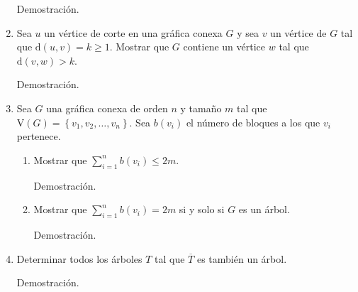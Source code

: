 \documentclass[12pt, fleqn]{article}
\newcommand{\V}[1]{\mathrm{V} \! \left( #1 \right)}
\newcommand{\dist}[2]{\mathrm{d}(#1,#2)}
\begin{document}
\begin{enumerate}
		Demostración.



		\item Sea $ u $ un vértice de corte en una gráfica conexa $ G $ y sea $ v $ un vértice de $ G $ tal que $ \dist{u}{v} = k \geq 1 $. Mostrar que $ G $ contiene un vértice $ w $ tal que $ \dist{v}{w} > k $.
		
		Demostración.



		\item Sea $ G $ una gráfica conexa de orden $ n $ y tamaño $ m $ tal que $ \V{G} = \left\{ v_1, v_2, \ldots, v_n \right\} $. Sea $ b(v_i) $ el número de bloques a los que $ v_i $ pertenece.
		
		\begin{enumerate}
			\item Mostrar que $ \displaystyle \sum_{i=1}^{n} b(v_i) \leq 2m $.
			
			Demostración.



			\item Mostrar que $ \displaystyle \sum_{i=1}^{n} b(v_i) = 2m $ si y solo si $ G $ es un árbol.
			
			Demostración.



		\end{enumerate}

		\item Determinar todos los árboles $ T $ tal que $ \overline{T} $ es también un árbol.
		
		Demostración.



	\end{enumerate}
\end{document}
